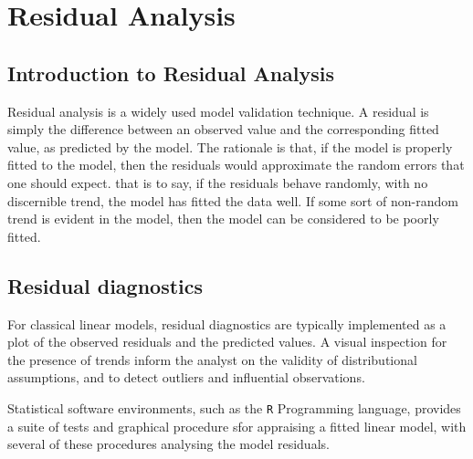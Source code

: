 \documentclass[Main.tex]{subfiles}
\begin{document}
\chapter{Residual Analysis}
\section{Introduction to Residual Analysis}
Residual analysis is a widely used model validation technique. A residual is simply the difference between an observed value and the corresponding fitted value, as predicted by the model. The rationale is that, if the model is properly fitted to the model, then the residuals would approximate the random errors that one should expect.
that is to say, if the residuals behave randomly, with no discernible trend, the model has fitted the data well. If some sort of non-random trend is evident in the model, then the model can be considered to be poorly fitted.

	\newpage
	\section{Residual diagnostics} %
	For classical linear models, residual diagnostics are typically implemented as a plot of the observed residuals and the predicted values. A visual inspection for the presence of trends inform the analyst on the validity of distributional assumptions, and to detect outliers and influential observations.
	
	
	
	

Statistical software environments, such as the \texttt{R} Programming language, provides a suite of tests and graphical procedure sfor appraising a fitted linear model, with several 
of these procedures analysing the model residuals.

\bigskip 
\end{document}
